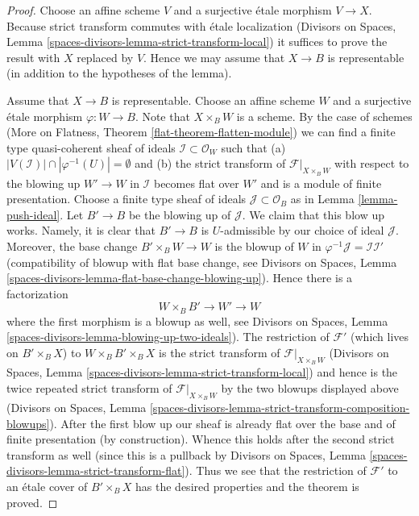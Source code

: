 \begin{proof}
Choose an affine scheme $V$ and a surjective \'etale morphism $V \to X$.
Because strict transform commutes with \'etale localization
(Divisors on Spaces, Lemma \ref{spaces-divisors-lemma-strict-transform-local})
it suffices to prove the result with $X$ replaced by $V$. Hence we
may assume that $X \to B$ is representable (in addition to the
hypotheses of the lemma).

\medskip\noindent
Assume that $X \to B$ is representable. Choose an affine scheme $W$ and a
surjective \'etale morphism $\varphi : W \to B$. Note that $X \times_B W$
is a scheme. By the case of schemes
(More on Flatness, Theorem \ref{flat-theorem-flatten-module})
we can find a finite type quasi-coherent sheaf of ideals
$\mathcal{I} \subset \mathcal{O}_W$ such that
(a) $|V(\mathcal{I})| \cap |\varphi^{-1}(U)| = \emptyset$ and (b)
the strict transform of $\mathcal{F}|_{X \times_B W}$ with respect
to the blowing up $W' \to W$ in $\mathcal{I}$ becomes flat over $W'$
and is a module of finite presentation. Choose a finite type sheaf of ideals
$\mathcal{J} \subset \mathcal{O}_B$ as in Lemma \ref{lemma-push-ideal}.
Let $B' \to B$ be the blowing up of $\mathcal{J}$. We claim that this
blow up works. Namely, it is clear that $B' \to B$ is $U$-admissible
by our choice of ideal $\mathcal{J}$. Moreover, the base change
$B' \times_B W \to W$ is the blowup of $W$ in
$\varphi^{-1}\mathcal{J} = \mathcal{I}\mathcal{I}'$
(compatibility of blowup with flat base change, see
Divisors on Spaces, Lemma
\ref{spaces-divisors-lemma-flat-base-change-blowing-up}).
Hence there is a factorization
$$
W \times_B B' \to W' \to W
$$
where the first morphism is a blowup as well, see
Divisors on Spaces, Lemma \ref{spaces-divisors-lemma-blowing-up-two-ideals}).
The restriction of $\mathcal{F}'$ (which lives on $B' \times_B X$)
to $W \times_B B' \times_B X$ is the strict transform of
$\mathcal{F}|_{X \times_B W}$
(Divisors on Spaces, Lemma \ref{spaces-divisors-lemma-strict-transform-local})
and hence is the twice repeated strict transform of
$\mathcal{F}|_{X \times_B W}$ by the two blowups displayed above
(Divisors on Spaces, Lemma
\ref{spaces-divisors-lemma-strict-transform-composition-blowups}).
After the first blow up our sheaf is already flat over
the base and of finite presentation (by construction). Whence this holds 
after the second strict transform as well (since this is a
pullback by Divisors on Spaces, Lemma
\ref{spaces-divisors-lemma-strict-transform-flat}).
Thus we see that the restriction of $\mathcal{F}'$
to an \'etale cover of $B' \times_B X$ has the desired properties
and the theorem is proved.
\end{proof}








